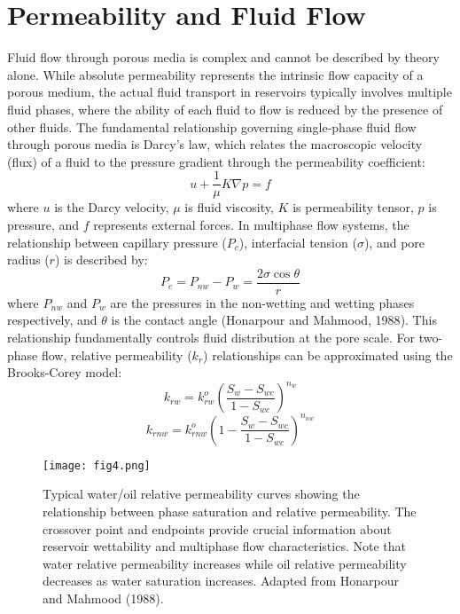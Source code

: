 \documentclass[journal]{IEEEtran}
\begin{document}
\section{Permeability and Fluid Flow}
Fluid flow through porous media is complex and cannot be described by theory alone. While absolute permeability represents the intrinsic flow capacity of a porous medium, the actual fluid transport in reservoirs typically involves multiple fluid phases, where the ability of each fluid to flow is reduced by the presence of other fluids.
The fundamental relationship governing single-phase fluid flow through porous media is Darcy's law, which relates the macroscopic velocity (flux) of a fluid to the pressure gradient through the permeability coefficient:
\begin{equation}
u + \frac{1}{\mu} K\nabla p = f
\end{equation}
where $u$ is the Darcy velocity, $\mu$ is fluid viscosity, $K$ is permeability tensor, $p$ is pressure, and $f$ represents external forces.
In multiphase flow systems, the relationship between capillary pressure ($P_c$), interfacial tension ($\sigma$), and pore radius ($r$) is described by:
\begin{equation}
P_c = P_{nw} - P_w = \frac{2\sigma\cos\theta}{r}
\end{equation}
where $P_{nw}$ and $P_w$ are the pressures in the non-wetting and wetting phases respectively, and $\theta$ is the contact angle (Honarpour and Mahmood, 1988\parencite{honarpour_relative-permeability_1988}). This relationship fundamentally controls fluid distribution at the pore scale.
For two-phase flow, relative permeability ($k_r$) relationships can be approximated using the Brooks-Corey model:
\begin{equation}
k_{rw} = k_{rw}^o(\frac{S_w - S_{wc}}{1 - S_{wc}})^{n_w}
\end{equation}
\begin{equation}
k_{rnw} = k_{rnw}^o(1 - \frac{S_w - S_{wc}}{1 - S_{wc}})^{n_{nw}}
\end{equation}

\begin{figure}[t]
    \centering
    \texttt{[image: fig4.png]}
    \caption{Typical water/oil relative permeability curves showing the relationship between phase saturation and relative permeability. The crossover point and endpoints provide crucial information about reservoir wettability and multiphase flow characteristics. Note that water relative permeability increases while oil relative permeability decreases as water saturation increases. Adapted from Honarpour and Mahmood (1988).}
    \label{fig:rel_perm}
    \end{figure}
\end{document}
